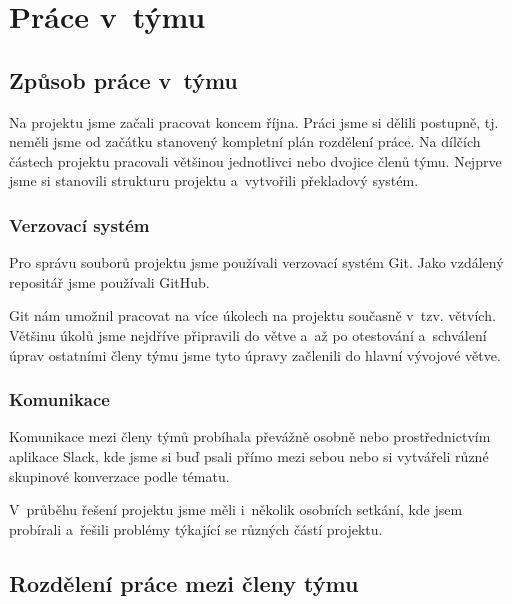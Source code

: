 \documentclass[a4paper, 11pt]{article}
\begin{document}
	\section{Práce v~týmu}

	\subsection{Způsob práce v~týmu}

	Na projektu jsme začali pracovat koncem října. Práci jsme si dělili postupně, tj. neměli jsme od začátku
	stanovený kompletní plán rozdělení práce. Na dílčích částech projektu pracovali většinou jednotlivci nebo
	dvojice členů týmu. Nejprve jsme si stanovili strukturu projektu a~vytvořili překladový systém.

	\subsubsection{Verzovací systém}

	Pro správu souborů projektu jsme používali verzovací systém Git. Jako vzdálený repositář jsme používali \mbox{GitHub}.

	Git nám umožnil pracovat na více úkolech na projektu současně v~tzv. větvích. Většinu úkolů jsme nejdříve připravili
	do větve a~až po otestování a~schválení úprav ostatními členy týmu jsme tyto úpravy začlenili do hlavní
	vývojové větve.

	\subsubsection{Komunikace}

	Komunikace mezi členy týmů probíhala převážně osobně nebo prostřednictvím aplikace Slack, kde jsme si buď
	psali přímo mezi sebou nebo si vytvářeli různé skupinové konverzace podle tématu.

	V~průběhu řešení projektu jsme měli i~několik osobních setkání, kde jsem probírali a~řešili problémy
	týkající se různých částí projektu.


	\subsection{Rozdělení práce mezi členy týmu}
\end{document}
